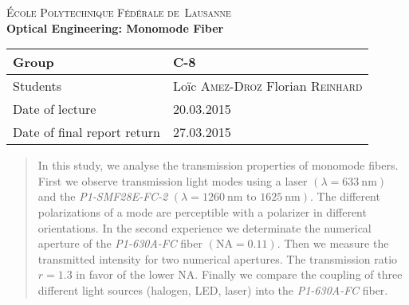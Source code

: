 \begin{titlepage}
\begin{center}
    \textsc{\LARGE École Polytechnique Fédérale de~Lausanne}\\[1.5cm] 
    {\huge \bfseries Optical Engineering: Monomode Fiber}\\[0.4cm] 
    \begin{tabular}{|p{5cm}|p{4cm}|}
        \hline
        Group & C-8 \\ \hline
        Students & Loïc \textsc{Amez-Droz} \newline Florian \textsc{Reinhard} \\ \hline
        Date of lecture & 20.03.2015 \\ \hline
        Date of final report return & 27.03.2015 \\ \hline
    \end{tabular}
\end{center}


\begin{abstract}
    In this study, we analyse the transmission properties of monomode fibers.
    First we observe transmission light modes using a laser $\left( \lambda = \SI{633}{\nano\meter} \right)$ and the \emph{P1-SMF28E-FC-2} $\left( \lambda = \SI{1260}{\nano\meter} \mbox{ to } \SI{1625}{\nano\meter} \right)$.
    The different polarizations of a mode are perceptible with a polarizer in different orientations.
    In the second experience we determinate the numerical aperture of the \emph{P1-630A-FC} fiber $\left( \mbox{NA} = 0.11 \right)$.
    Then we measure the transmitted intensity for two numerical apertures.
    The transmission ratio $r = 1.3$ in favor of the lower NA.
    Finally we compare the coupling of three different light sources (halogen, LED, laser) into the \emph{P1-630A-FC} fiber.
\end{abstract}
 
\vfill
\end{titlepage}
